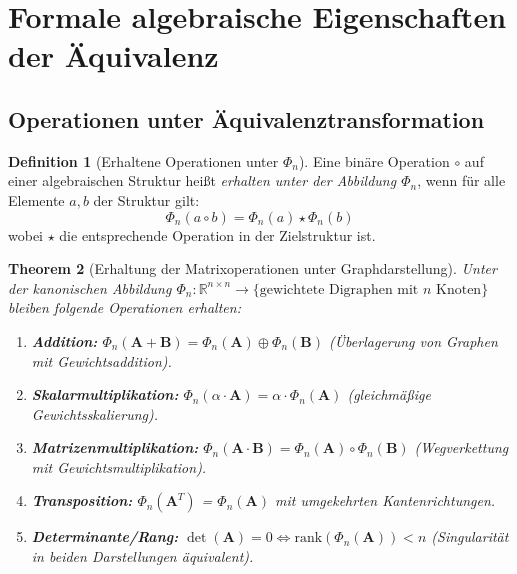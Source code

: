 \documentclass[12pt, a4paper]{article}
\newtheorem{theorem}{Theorem}[section]
\theoremstyle{definition}
\newtheorem{definition}[theorem]{Definition}
\theoremstyle{remark}
\newcommand{\R}{\mathbb{R}}
\newcommand{\vA}{\bm{A}}
\newcommand{\vB}{\bm{B}}
\begin{document}
\section{Formale algebraische Eigenschaften der Äquivalenz}
\label{sec:algebraische_eigenschaften}

\subsection{Operationen unter Äquivalenztransformation}
\label{subsec:operationen_aequivalenz}

\begin{definition}[Erhaltene Operationen unter $\Phi_n$]
\label{def:erhaltene_operationen}
Eine binäre Operation $\circ$ auf einer algebraischen Struktur heißt \emph{erhalten unter der Abbildung $\Phi_n$}, wenn für alle Elemente $a, b$ der Struktur gilt:
\[
  \Phi_n(a \circ b) = \Phi_n(a) \star \Phi_n(b)
\]
wobei $\star$ die entsprechende Operation in der Zielstruktur ist.
\end{definition}

\begin{theorem}[Erhaltung der Matrixoperationen unter Graphdarstellung]
\label{thm:erhaltung_operationen}
Unter der kanonischen Abbildung $\Phi_n: \R^{n \times n} \to \{\text{gewichtete Digraphen mit } n \text{ Knoten}\}$ bleiben folgende Operationen erhalten:
\begin{enumerate}[label=(\roman*)]
  \item \textbf{Addition:} $\Phi_n(\vA + \vB) = \Phi_n(\vA) \oplus \Phi_n(\vB)$ (Überlagerung von Graphen mit Gewichtsaddition).
  \item \textbf{Skalarmultiplikation:} $\Phi_n(\alpha \cdot \vA) = \alpha \cdot \Phi_n(\vA)$ (gleichmäßige Gewichtsskalierung).
  \item \textbf{Matrizenmultiplikation:} $\Phi_n(\vA \cdot \vB) = \Phi_n(\vA) \circ \Phi_n(\vB)$ (Wegverkettung mit Gewichtsmultiplikation).
  \item \textbf{Transposition:} $\Phi_n(\vA^T)$ = $\Phi_n(\vA)$ mit umgekehrten Kantenrichtungen.
  \item \textbf{Determinante/Rang:} $\det(\vA) = 0 \iff \text{rank}(\Phi_n(\vA)) < n$ (Singularität in beiden Darstellungen äquivalent).
\end{enumerate}
\end{theorem}
\end{document}
